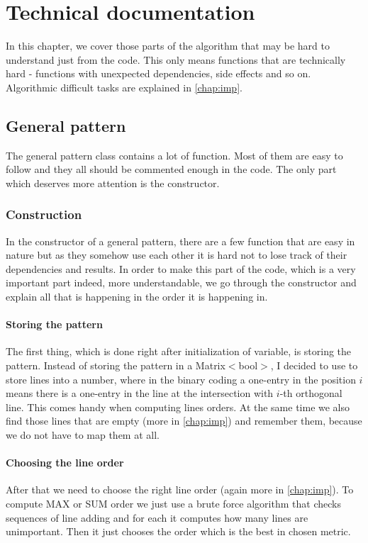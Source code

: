 \chapter{Technical documentation}
\label{chap:tdoc}
In this chapter, we cover those parts of the algorithm that may be hard to understand just from the code. This only means functions that are technically hard - functions with unexpected dependencies, side effects and so on. Algorithmic difficult tasks are explained in \autoref{chap:imp}.

\section{General pattern}
The general pattern class contains a lot of function. Most of them are easy to follow and they all should be commented enough in the code. The only part which deserves more attention is the constructor.

\subsection{Construction}
In the constructor of a general pattern, there are a few function that are easy in nature but as they somehow use each other it is hard not to lose track of their dependencies and results. In order to make this part of the code, which is a very important part indeed, more understandable, we go through the constructor and explain all that is happening in the order it is happening in.

\subsubsection{Storing the pattern}
The first thing, which is done right after initialization of variable, is storing the pattern. Instead of storing the pattern in a Matrix$<$bool$>$, I decided to use to store lines into a number, where in the binary coding a one-entry in the position $i$ means there is a one-entry in the line at the intersection with $i$-th orthogonal line. This comes handy when computing lines orders. At the same time we also find those lines that are empty (more in \autoref{chap:imp}) and remember them, because we do not have to map them at all.

\subsubsection{Choosing the line order}
After that we need to choose the right line order (again more in \autoref{chap:imp}). To compute MAX or SUM order we just use a brute force algorithm that checks sequences of line adding and for each it computes how many lines are unimportant. Then it just chooses the order which is the best in chosen metric.

